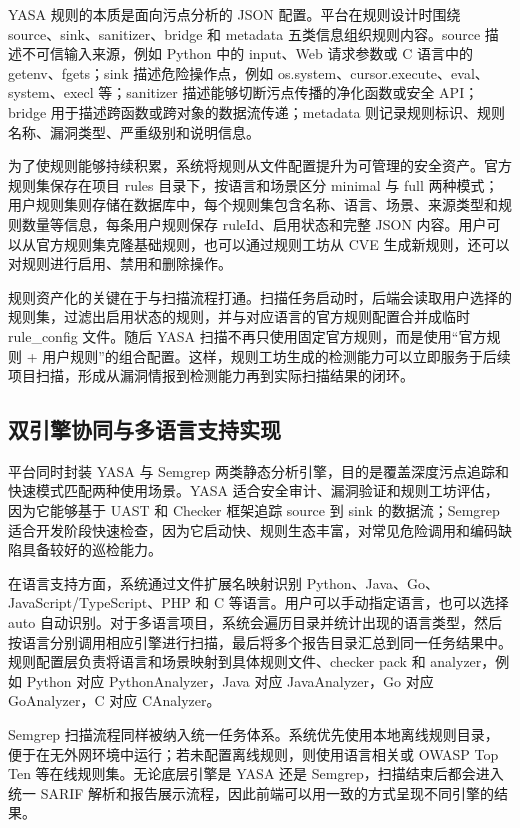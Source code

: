 \documentclass[a4paper,12pt,UTF8]{ctexart}
\numberwithin{figure}{section}
\numberwithin{table}{section}
\numberwithin{equation}{section}
\begin{document}
{\songti
YASA 规则的本质是面向污点分析的 JSON 配置。平台在规则设计时围绕 source、sink、sanitizer、bridge 和 metadata 五类信息组织规则内容。source 描述不可信输入来源，例如 Python 中的 input、Web 请求参数或 C 语言中的 getenv、fgets；sink 描述危险操作点，例如 os.system、cursor.execute、eval、system、execl 等；sanitizer 描述能够切断污点传播的净化函数或安全 API；bridge 用于描述跨函数或跨对象的数据流传递；metadata 则记录规则标识、规则名称、漏洞类型、严重级别和说明信息。

为了使规则能够持续积累，系统将规则从文件配置提升为可管理的安全资产。官方规则集保存在项目 rules 目录下，按语言和场景区分 minimal 与 full 两种模式；用户规则集则存储在数据库中，每个规则集包含名称、语言、场景、来源类型和规则数量等信息，每条用户规则保存 ruleId、启用状态和完整 JSON 内容。用户可以从官方规则集克隆基础规则，也可以通过规则工坊从 CVE 生成新规则，还可以对规则进行启用、禁用和删除操作。

规则资产化的关键在于与扫描流程打通。扫描任务启动时，后端会读取用户选择的规则集，过滤出启用状态的规则，并与对应语言的官方规则配置合并成临时 rule\_config 文件。随后 YASA 扫描不再只使用固定官方规则，而是使用“官方规则 + 用户规则”的组合配置。这样，规则工坊生成的检测能力可以立即服务于后续项目扫描，形成从漏洞情报到检测能力再到实际扫描结果的闭环。
\par}

\subsection{双引擎协同与多语言支持实现}

{\songti
平台同时封装 YASA 与 Semgrep 两类静态分析引擎，目的是覆盖深度污点追踪和快速模式匹配两种使用场景。YASA 适合安全审计、漏洞验证和规则工坊评估，因为它能够基于 UAST 和 Checker 框架追踪 source 到 sink 的数据流；Semgrep 适合开发阶段快速检查，因为它启动快、规则生态丰富，对常见危险调用和编码缺陷具备较好的巡检能力。

在语言支持方面，系统通过文件扩展名映射识别 Python、Java、Go、JavaScript/TypeScript、PHP 和 C 等语言。用户可以手动指定语言，也可以选择 auto 自动识别。对于多语言项目，系统会遍历目录并统计出现的语言类型，然后按语言分别调用相应引擎进行扫描，最后将多个报告目录汇总到同一任务结果中。规则配置层负责将语言和场景映射到具体规则文件、checker pack 和 analyzer，例如 Python 对应 PythonAnalyzer，Java 对应 JavaAnalyzer，Go 对应 GoAnalyzer，C 对应 CAnalyzer。

Semgrep 扫描流程同样被纳入统一任务体系。系统优先使用本地离线规则目录，便于在无外网环境中运行；若未配置离线规则，则使用语言相关或 OWASP Top Ten 等在线规则集。无论底层引擎是 YASA 还是 Semgrep，扫描结束后都会进入统一 SARIF 解析和报告展示流程，因此前端可以用一致的方式呈现不同引擎的结果。
\par}
\end{document}
